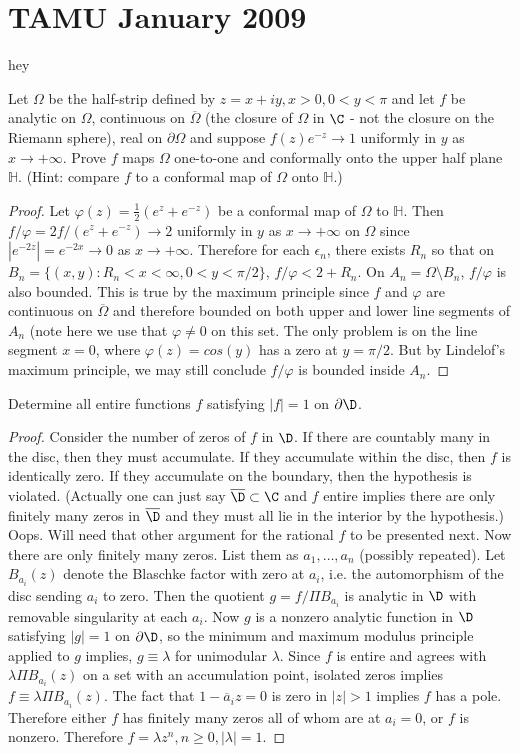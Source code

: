 \documentclass[11pt]{book}
\theoremstyle{definition}
\renewcommand{\H}{\mathbb{H}}
\begin{document}
\section{TAMU January 2009}
hey

Let $\Omega$ be the half-strip defined by $z=x+iy, x>0, 0<y<\pi$ and let $f$ be analytic on $\Omega$, continuous on $\overline{\Omega}$ (the closure of $\Omega$ in $\C$ - not the closure on the Riemann sphere), real on $\partial\Omega$ and suppose $f(z)e^{-z}\to 1$ uniformly in $y$ as $x\to +\infty$. Prove $f$ maps $\Omega$ one-to-one and conformally onto the upper half plane $\H$. (Hint: compare $f$ to a conformal map of $\Omega$ onto $\H$.)
\begin{proof}
Let $\varphi(z)=\frac{1}{2}(e^z+e^{-z})$ be a conformal map of $\Omega$ to $\H$. Then $f/\varphi=2f/(e^z+e^{-z})\to 2$ uniformly in $y$ as $x\to +\infty$ on $\Omega$ since $|e^{-2z}|=e^{-2x}\to0$ as $x\to+\infty$. Therefore for each $\epsilon_n$, there exists $R_n$ so that on $B_n=\{(x,y):R_n < x < \infty, 0<y<\pi/2\}$, $f/\varphi < 2 + R_n$. On $A_n=\Omega\setminus B_n$, $f/\varphi$ is also bounded. This is true by the maximum principle since $f$ and $\varphi$ are continuous on $\overline{\Omega}$ and therefore bounded on both upper and lower line segments of $A_n$ (note here we use that $\varphi\neq 0$ on this set. The only problem is on the line segment $x=0$, where $\varphi(z)=cos(y)$ has a zero at $y=\pi/2$. But by Lindelof's maximum principle, we may still conclude $f/\varphi$ is bounded inside $A_n$.
\end{proof}
Determine all entire functions $f$ satisfying $|f|=1$ on $\partial\D$.
\begin{proof}
Consider the number of zeros of $f$ in $\D$. If there are countably many in the disc, then they must accumulate. If they accumulate within the disc, then $f$ is identically zero. If they accumulate on the boundary, then the hypothesis is violated. (Actually one can just say $\overline{\D}\subset\C$ and $f$ entire implies there are only finitely many zeros in $\overline{\D}$ and they must all lie in the interior by the hypothesis.) Oops. Will need that other argument for the rational $f$ to be presented next. Now there are only finitely many zeros. List them as $a_1,\dotsc,a_n$ (possibly repeated). Let $B_{a_i}(z)$ denote the Blaschke factor with zero at $a_i$, i.e. the automorphism of the disc sending $a_i$ to zero. Then the quotient $g = f/\Pi B_{a_i}$ is analytic in $\D$ with removable singularity at each $a_i$. Now $g$ is a nonzero analytic function in $\D$ satisfying $|g|=1$ on $\partial\D$, so the minimum and maximum modulus principle applied to $g$ implies, $g\equiv \lambda$ for unimodular $\lambda$. Since $f$ is entire and agrees with $\lambda\Pi B_{a_i}(z)$ on a set with an accumulation point, isolated zeros implies $f\equiv \lambda\Pi B_{a_i}(z)$. The fact that $1-\overline a_iz=0$ is zero in $|z|>1$ implies $f$ has a pole. Therefore either $f$ has finitely many zeros all of whom are at $a_i=0$, or $f$ is nonzero. Therefore $f=\lambda z^n, n\geq0, |\lambda|=1$.
\end{proof}
\end{document}
